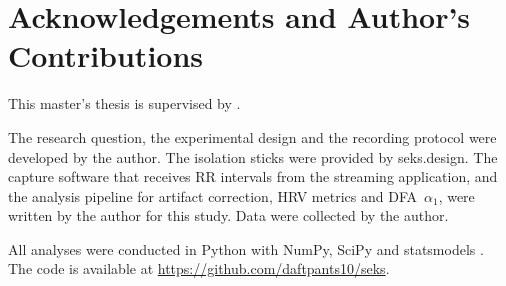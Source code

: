 \section*{Acknowledgements and Author's Contributions}

This master's thesis is supervised by . 

The research question, the experimental design and the recording protocol were developed by the author. The isolation sticks were provided by seks.design. The capture software that receives RR intervals from the streaming application, and the analysis pipeline for artifact correction, HRV metrics and DFA~$\alpha_1$, were written by the author for this study. Data were collected by the author.

All analyses were conducted in Python  with NumPy, SciPy and statsmodels . The code is available at \url{https://github.com/daftpants10/seks}.


